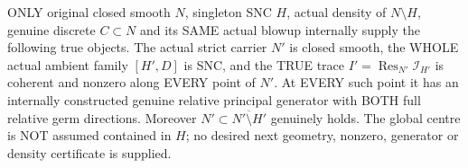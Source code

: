 \begin{theorem}
\label{hir:sharp-actual-mixed-discrete-centre-whole-strict-trace-geometry-density}
\leanok
ONLY original closed smooth $N$, singleton SNC $H$, actual density of
$N\setminus H$, genuine discrete $C\subset N$ and its SAME actual
blowup internally supply the following true objects. The actual strict
carrier $N'$ is closed smooth, the WHOLE actual ambient family $[H',D]$
is SNC, and the TRUE trace $I'=\operatorname{Res}_{N'}\mathcal I_{H'}$
is coherent and nonzero along EVERY point of $N'$. At EVERY such point
it has an internally constructed genuine relative principal generator
with BOTH full relative germ directions. Moreover
$N'\subset\overline{N'\setminus H'}$ genuinely holds. The global centre
is NOT assumed contained in $H$; no desired next geometry, nonzero,
generator or density certificate is supplied.
\end{theorem}
